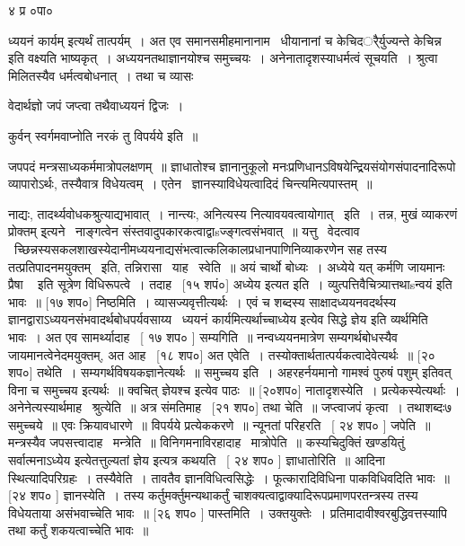 \documentclass[11pt, openany]{book}
\begin{document}
४ प्र ०पा० 



{\qt ध्ययनं कार्यम्} इत्यर्थं तात्पर्यम्~। अत एव समानसमीहमानानाम \textendash\ 
धीयानानां च केचिदर्ैर्युज्यन्ते {\qt केचिन्न} इति वक्ष्यति भाष्यकृत्~। 
अध्ययनतथाज्ञानयोश्च समुच्चयः~। अनेनातादृशस्याधर्मत्वं सूचयति~। श्रुत्वा
मिलितस्यैव धर्मत्वबोधनात्~। तथा च व्यासः \textendash\ 

वेदार्थज्ञो जपं जप्त्वा तथैवाध्ययनं द्विजः~। 

कुर्वन् स्वर्गमवाप्नोति नरकं तु विपर्यये इति~॥ 

जपपदं मन्त्रसाध्यकर्ममात्रोपलक्षणम्~॥ ज्ञाधातोश्च ज्ञानानुकूलो
मनःप्रणिधानऽविषयेन्द्रियसंयोगसंपादनादिरूपो व्यापारोऽर्थः, तस्यैवात्र
विधेयत्वम्~। एतेन \textendash\ ज्ञानस्याविधेयत्वादिदं चिन्त्यमित्यपास्तम्~॥ 



नाद्यः, तादर्थ्यवोधकश्रुत्याद्यभावात्~। नान्त्यः, अनित्यस्य
नित्यावयवत्वायोगात् \textendash\ इति~। तन्न, {\qt मुखं व्याकरणं प्रोक्तम्} इ्त्यने \textendash\ 
नाङ्गत्वेन संस्तवादुपकारकत्वाद्वाsज्ङ्गत्वसंभवात्~॥ यत्तु \textendash\ वेदत्वाव \textendash\ 
च्छिन्नस्यसकलशाखस्येदानीमध्ययनाद्यसंभत्वात्कलिकालप्रधानपाणिनिव्याकरणेन
सह तस्य तत्प्रतिपादनमयुक्तम् \textendash\ इति, तन्निरासा \textendash\ याह \textendash\ स्वेति~॥ अयं {\qt 
चार्थो बोध्यः~।} अध्येये यत् कर्मणि जायमानः {\qt प्रैषा \textendash\ } इति सूत्रेण
विधिरूपत्वे~। तदाह \textendash\ [१५ शपं०] अध्येय इत्यत इति~। 
व्युत्पत्तिवैचित्र्यात्तथाsन्वयं इति भावः~॥ [१७ शप०] निष्ठमिति~। 
व्यासज्यवृत्तीत्यर्थः~। एवं च शब्दस्य साक्षादध्ययनवदर्थस्य
ज्ञानद्वाराऽध्ययनसंभवादर्थबोधपर्यवसाय्य \textendash\ ध्ययनं
कार्यमित्यर्थाच्चाध्येय इत्येव सिद्धे ज्ञेय इति व्यर्थमिति भावः~। अत एव
सामर्थ्यादाह \textendash\ [ १७ शप० ] सम्यगिति~॥ नन्वध्ययनमात्रेण
सम्यगर्थबोधस्यैव जायमानत्वेनेदमयुक्तम्, अत आह \textendash\ [१८ शप०] अत एवेति~। 
तस्योक्तार्थतात्पर्यकत्वादेवेत्यर्थः~॥ [२० शप०] तथेति~। 
सम्यगर्थविषयकज्ञानेत्यर्थः~॥ समुच्चय इति~। {\qt अहरहर्नयमानो गामश्वं
पुरुषं पशुम्} इतिवत् विना च समुच्चय इत्यर्थः~॥ क्वचित् {\qt ज्ञेयश्च}
इत्येव पाठः~॥ [२०शप०] नातादृशस्येति~। प्रत्येकस्येत्यर्थाः~। 
अनेनेत्यस्यार्थमाह \textendash\ श्रुत्येति~॥ अत्र संमतिमाह \textendash\ [२१ शप०] तथा चेति~॥
जप्त्वाजपं कृत्वा~। तथाशब्दः७ समुच्चये~॥ एवः क्रियावधारणे~॥ विपर्यये
प्रत्येककरणे~॥ न्यूनतां परिहरति \textendash\ [ २४ शप० ] जपेति~॥ मन्त्रस्यैव
जपसत्त्वादाह \textendash\ मन्त्रेति~॥ विनिगमनाविरहादाह \textendash\ मात्रोपेति~॥ कस्यचिदुक्तिं
खण्डयितुं सर्वात्मनाऽध्येय इत्येतत्तुल्यतां ज्ञेय इत्यत्र कथयति \textendash\ [
२४ शप० ] ज्ञाधातोरिति~॥ आदिना स्थित्यादिपरिग्रहः~। तस्यैवेति~। तावतैव
ज्ञानविधित्वसिद्धेः~। फूत्कारादिविधिना पाकविधिवदिति भावः~॥ [२४ शप०
] ज्ञानस्येति~। तस्य कर्तुमर्क्तुमन्यथाकर्तुं
चाशक्यत्वाद्वाक्यादिरूपप्रमाणपरतन्त्रस्य तस्य विधेयताया असंभवाच्चेति
भावः~॥ [२६ शप० ] पास्तमिति~। उक्तयुक्तेः~। 
प्रतिमादावीश्वरबुद्धिवत्तस्यापि तथा कर्तुं शकयत्वाच्चेति भावः~॥ 
\end{document}
